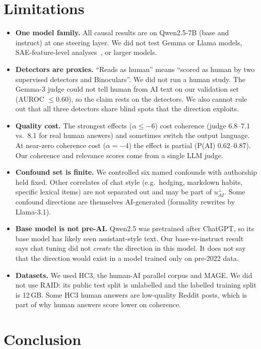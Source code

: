 \section{Limitations}
\label{sec:limitations}

\begin{itemize}
    \item \textbf{One model family.} All causal results are on Qwen2.5-7B (base and instruct) at one steering layer. We did not test Gemma or Llama models, SAE-feature-level analyses~\citep{kuznetsov2025feature}, or larger models.
    \item \textbf{Detectors are proxies.} ``Reads as human'' means ``scored as human by two supervised detectors and Binoculars''. We did not run a human study. The Gemma-3 judge could not tell human from AI text on our validation set (AUROC $\leq$0.60), so the claim rests on the detectors. We also cannot rule out that all three detectors share blind spots that the direction exploits.
    \item \textbf{Quality cost.} The strongest effects ($\alpha{\leq}{-}6$) cost coherence (judge 6.8--7.1 vs.\ 8.1 for real human answers) and sometimes switch the output language. At near-zero coherence cost ($\alpha{=}{-}4$) the effect is partial (P(AI) 0.62--0.87). Our coherence and relevance scores come from a single LLM judge.
    \item \textbf{Confound set is finite.} We controlled six named confounds with authorship held fixed. Other correlates of chat style (e.g.\ hedging, markdown habits, specific lexical items) are not separated out and may be part of $u_{AI}^{\perp}$. Some confound directions are themselves AI-generated (formality rewrites by Llama-3.1).
    \item \textbf{Base model is not pre-AI.} Qwen2.5 was pretrained after ChatGPT, so its base model has likely seen assistant-style text. Our base-vs-instruct result says chat tuning did not \emph{create} the direction in this model. It does not say that the direction would exist in a model trained only on pre-2022 data.
    \item \textbf{Datasets.} We used HC3, the human-AI parallel corpus and MAGE. We did not use RAID: its public test split is unlabelled and the labelled training split is 12\,GB. Some HC3 human answers are low-quality Reddit posts, which is part of why human answers score lower on coherence.
\end{itemize}

\section{Conclusion}
\label{sec:conclusion}

